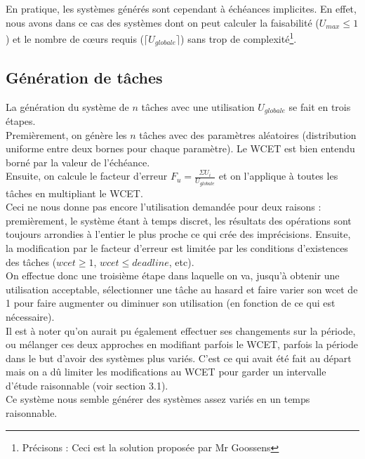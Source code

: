 \documentclass[a4paper,10pt]{article}
\begin{document}
		En pratique, les systèmes générés sont cependant à échéances implicites.
		En effet, nous avons dans ce cas des systèmes dont on peut calculer la faisabilité ($U_{max} \le 1$) et le nombre de cœurs requis ($\lceil 					U_{globale} \rceil$) sans trop de complexité\footnote{Précisons : Ceci est la solution proposée par Mr Goossens}.

	\subsection{Génération de tâches}
		La génération du système de $n$ tâches avec une utilisation $U_{globale}$ se fait en trois étapes.\\

		Premièrement, on génère les $n$ tâches avec des paramètres aléatoires (distribution uniforme entre deux bornes pour chaque paramètre). Le WCET est 			bien entendu borné par la valeur de l'échéance.\\

		Ensuite, on calcule le facteur d'erreur $F_u = \frac{\Sigma U_i}{U_{globale}}$ et on l'applique à toutes les tâches en multipliant le WCET.\\

		Ceci ne nous donne pas encore l'utilisation demandée pour deux raisons : premièrement, le système étant à temps discret, les résultats des opérations sont toujours arrondies à l'entier le plus proche ce qui crée des imprécisions. Ensuite, la modification par le facteur d'erreur est limitée par les conditions d'existences des tâches ($wcet \ge 1$, $wcet \le deadline$, etc).\\

		On effectue donc une troisième étape dans laquelle on va, jusqu'à obtenir une utilisation acceptable, sélectionner une tâche au hasard et faire varier son wcet de 1 pour faire augmenter ou diminuer son utilisation (en fonction de ce qui est nécessaire).\\
		
		Il est à noter qu'on aurait pu également effectuer ses changements sur la période, ou mélanger ces deux approches en modifiant parfois le WCET, parfois la période dans le but d'avoir des systèmes plus variés. C'est ce qui avait été fait au départ mais on a dû limiter les modifications au WCET pour garder un intervalle d'étude raisonnable (voir section 3.1).\\

		Ce système nous semble générer des systèmes assez variés en un temps raisonnable.
\end{document}
